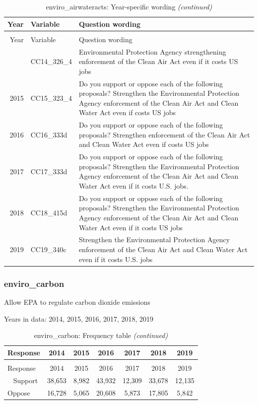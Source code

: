 \documentclass[12pt]{article}
\begin{document}
\begin{longtable}[t]{rl>{\raggedright\arraybackslash}p{10cm}}
\caption{\label{tab:unnamed-chunk-4}enviro\_airwateracts: Year-specific wording}\\
\toprule
Year & Variable & Question wording\\
\midrule
\endfirsthead
\caption[]{enviro\_airwateracts: Year-specific wording \textit{(continued)}}\\
\toprule
Year & Variable & Question wording\\
\midrule
\endhead
\
\endfoot
\bottomrule
\endlastfoot
2014 & CC14\_326\_4 & Environmental Protection Agency strengthening enforcement of the Clean Air Act even if it costs US jobs\\
2015 & CC15\_323\_4 & Do you support or oppose each of the following proposals? Strengthen the Environmental Protection Agency enforcement of the Clean Air Act and Clean Water Act even if costs US jobs\\
2016 & CC16\_333d & Do you support or oppose each of the following proposals? Strengthen enforcement of the Clean Air Act and Clean Water Act even if costs US jobs\\
2017 & CC17\_333d & Do you support or oppose each of the following proposals? Strengthen the Environmental Protection Agency enforcement of the Clean Air Act and Clean Water Act even if it costs U.S. jobs.\\
2018 & CC18\_415d & Do you support or oppose each of the following proposals? Strengthen the Environmental Protection Agency enforcement of the Clean Air Act and Clean Water Act even if it costs US jobs\\
2019 & CC19\_340c & Strengthen the Environmental Protection Agency enforcement of the Clean Air Act and Clean Water Act even if it costs U.S. jobs\\*
\end{longtable}

\subsubsection{enviro\_carbon}\label{enviro_carbon}

Allow EPA to regulate carbon dioxide emissions

Years in data: 2014, 2015, 2016, 2017, 2018,
2019\begingroup\fontsize{10}{12}\selectfont

\begin{longtable}[t]{lcccccc}
\caption{\label{tab:unnamed-chunk-4}enviro\_carbon: Frequency table}\\
\toprule
Response & 2014 & 2015 & 2016 & 2017 & 2018 & 2019\\
\midrule
\endfirsthead
\caption[]{enviro\_carbon: Frequency table \textit{(continued)}}\\
\toprule
Response & 2014 & 2015 & 2016 & 2017 & 2018 & 2019\\
\midrule
\endhead
\
\endfoot
\bottomrule
\endlastfoot
Support & 38,653 & 8,982 & 43,932 & 12,309 & 33,678 & 12,135\\
Oppose & 16,728 & 5,065 & 20,608 & 5,873 & 17,805 & 5,842\\*
\end{longtable}
\end{document}
